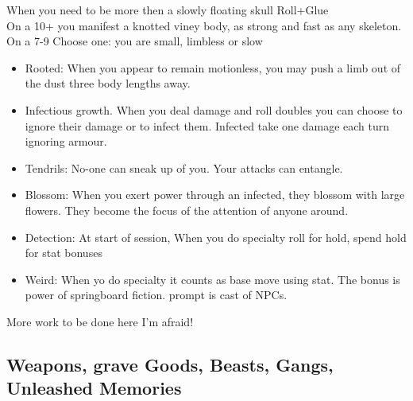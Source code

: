  When you need to be more then a slowly floating skull Roll+Glue
\\On a 10+ you manifest a knotted viney body, as strong and fast as any skeleton.
\\On a 7-9 Choose one: you are small, limbless or slow
\begin{itemize}
\item  Rooted: When you appear to remain motionless, you may push a limb out of the dust three body lengths away.
\item  Infectious growth. When you deal damage and roll doubles you can choose to ignore their damage or to infect them. Infected take one damage each turn ignoring armour.
\item  Tendrils: No-one can sneak up of you. Your attacks can entangle.
\item  Blossom: When you exert power through an infected, they blossom with large flowers. They become the focus of the attention of anyone around.
\item  Detection: At start of session, When you do specialty roll for hold, spend hold for stat bonuses
\item  Weird: When yo do specialty it counts as base move using stat. The bonus is power of springboard fiction. prompt is cast of NPCs.
\end{itemize}

More work to be done here I'm afraid!

\newpage
\subsection{Weapons, grave Goods, Beasts, Gangs, Unleashed Memories}
